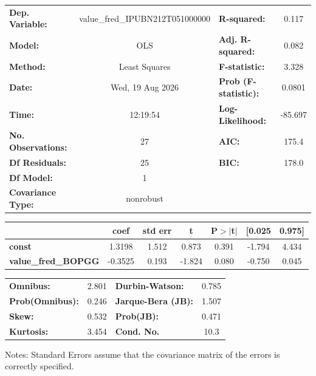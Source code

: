 \begin{center}
\begin{tabular}{lclc}
\toprule
\textbf{Dep. Variable:}     & value\_fred\_IPUBN212T051000000 & \textbf{  R-squared:         } &     0.117   \\
\textbf{Model:}             &               OLS               & \textbf{  Adj. R-squared:    } &     0.082   \\
\textbf{Method:}            &          Least Squares          & \textbf{  F-statistic:       } &     3.328   \\
\textbf{Date:}              &         Wed, 19 Aug 2026        & \textbf{  Prob (F-statistic):} &   0.0801    \\
\textbf{Time:}              &             12:19:54            & \textbf{  Log-Likelihood:    } &   -85.697   \\
\textbf{No. Observations:}  &                  27             & \textbf{  AIC:               } &     175.4   \\
\textbf{Df Residuals:}      &                  25             & \textbf{  BIC:               } &     178.0   \\
\textbf{Df Model:}          &                   1             & \textbf{                     } &             \\
\textbf{Covariance Type:}   &            nonrobust            & \textbf{                     } &             \\
\bottomrule
\end{tabular}
\begin{tabular}{lcccccc}
                            & \textbf{coef} & \textbf{std err} & \textbf{t} & \textbf{P$> |$t$|$} & \textbf{[0.025} & \textbf{0.975]}  \\
\midrule
\textbf{const}              &       1.3198  &        1.512     &     0.873  &         0.391        &       -1.794    &        4.434     \\
\textbf{value\_fred\_BOPGG} &      -0.3525  &        0.193     &    -1.824  &         0.080        &       -0.750    &        0.045     \\
\bottomrule
\end{tabular}
\begin{tabular}{lclc}
\textbf{Omnibus:}       &  2.801 & \textbf{  Durbin-Watson:     } &    0.785  \\
\textbf{Prob(Omnibus):} &  0.246 & \textbf{  Jarque-Bera (JB):  } &    1.507  \\
\textbf{Skew:}          &  0.532 & \textbf{  Prob(JB):          } &    0.471  \\
\textbf{Kurtosis:}      &  3.454 & \textbf{  Cond. No.          } &     10.3  \\
\bottomrule
\end{tabular}
\end{center}

Notes: \newline
 [1] Standard Errors assume that the covariance matrix of the errors is correctly specified.